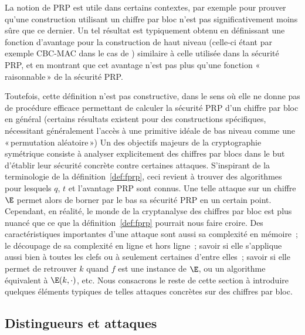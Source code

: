 \medskip


La notion de PRP est utile dans certains contextes, par exemple pour prouver qu'une construction utilisant un chiffre par bloc n'est pas significativement moins
sûre que ce dernier. Un tel résultat est typiquement obtenu en définissant une fonction d'avantage pour la construction de haut niveau (celle-ci
étant par exemple CBC-MAC dans le cas de \cite{DBLP:journals/jcss/BellareKR00}) similaire à celle utilisée dans la sécurité PRP, et en montrant
que cet avantage n'est pas plus qu'une fonction «\,raisonnable\,» de la sécurité PRP.

Toutefois, cette définition n'est pas constructive, dans le sens où elle ne donne pas de procédure efficace permettant de calculer la sécurité PRP
d'un chiffre par bloc en général (certains résultats existent pour des constructions spécifiques, nécessitant généralement l'accès à une
primitive idéale de bas niveau comme une «\,permutation aléatoire\,»)
Un des objectifs majeurs de la cryptographie symétrique consiste à analyser explicitement des chiffres par blocs dans le but d'établir leur sécurité
concrète contre certaines attaques. S'inspirant de la terminologie de la définition~\ref{def:fprp}, ceci revient à trouver
des algorithmes pour lesquels $q$, $t$ et l'avantage PRP sont connus. Une telle attaque sur un chiffre $\E$ permet alors de borner par le bas sa sécurité PRP
en un certain point.
Cependant, en réalité, le monde de la cryptanalyse des chiffres par bloc est plus nuancé que ce que la définition~\ref{def:fprp} pourrait nous faire croire.
Des caractéristiques importantes d'une attaque sont aussi sa complexité en mémoire~; le découpage de sa complexité en ligne et hors ligne~; savoir si elle s'applique
aussi bien à toutes les clefs ou à seulement certaines d'entre elles~; savoir si elle permet de retrouver $k$ quand $f$ est une instance de $\E$, ou un algorithme
équivalent à $\E(k,\cdot)$, etc.
Nous consacrons le reste de cette section à introduire quelques éléments typiques de telles attaques concrètes sur des chiffres par bloc.

\subsection{Distingueurs et attaques}

